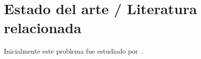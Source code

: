 \chapter{Estado del arte / Literatura relacionada}

Inicialmente este problema fue estudiado por~\cite{knuth2014art}.

\bigskip